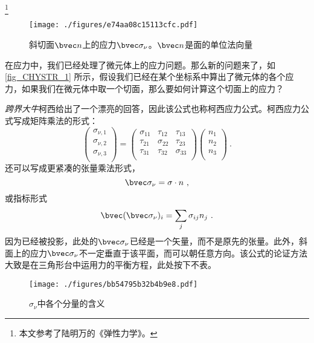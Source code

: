 
\footnote{本文参考了陆明万的《弹性力学》。}

\begin{figure}[ht]
\centering
\texttt{[image: ./figures/e74aa08c15113cfc.pdf]}
\caption{斜切面$\bvec n$上的应力$\bvec \sigma_\nu$。$\bvec n$是面的单位法向量} \label{fig_CHYSTR_1}
\end{figure}

在应力中，我们已经处理了微元体上的应力问题。那么新的问题来了，如\autoref{fig_CHYSTR_1} 所示，假设我们已经在某个坐标系中算出了微元体的各个应力，如果我们在微元体中取一个切面，那么要如何计算这个切面上的应力？

\textsl{跨界大牛}柯西给出了一个漂亮的回答，因此该公式也称柯西应力公式。柯西应力公式写成矩阵乘法的形式：
\begin{equation}\label{eq_CHYSTR_1}
\begin{pmatrix}
\sigma_{\nu,1}\\
\sigma_{\nu,2}\\
\sigma_{\nu,3}\\
\end{pmatrix}
=
\begin{pmatrix}
\sigma_{11} & \tau_{12} & \tau_{13} \\
\tau_{21} & \sigma_{22} & \tau_{23} \\
\tau_{31} & \tau_{32} & \sigma_{33} \\
\end{pmatrix}
\begin{pmatrix}
n_1\\
n_2\\
n_3\\
\end{pmatrix}~.
\end{equation}
还可以写成更紧凑的张量乘法形式，
\begin{equation}
\bvec \sigma_\nu = \sigma \cdot n ~,
\end{equation}
或指标形式
\begin{equation}
\bvec (\bvec \sigma_\nu)_i = \sum_j \sigma_{ij} n_j~.
\end{equation}
因为已经被投影，此处的$\bvec \sigma_\nu$已经是一个矢量，而不是原先的张量。此外，斜面上的应力$\bvec \sigma_\nu$不一定垂直于该平面，而可以朝任意方向。该公式的论证方法大致是在三角形台中运用力的平衡方程，此处按下不表。

\begin{figure}[ht]
\centering
\texttt{[image: ./figures/bb54795b32b4b9e8.pdf]}
\caption{$\sigma_\nu$中各个分量的含义} \label{fig_CHYSTR_2}
\end{figure}


